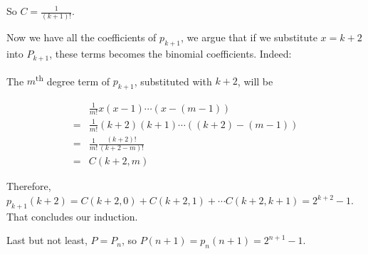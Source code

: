 So $ C = \frac{1}{(k + 1)!} $.

Now we have all the coefficients of $ p_{k+1} $, we argue that if we substitute $ x = k + 2 $ into $ P_{k+1} $, these terms becomes the binomial coefficients. Indeed:

The $ m $\textsuperscript{th} degree term of $ p_{k+1} $, substituted with $ k + 2 $, will be

\begin{align*}
   & \frac{1}{m!}x(x-1)\cdots(x-(m-1))         \\
  =& \frac{1}{m!}(k+2)(k+1)\cdots((k+2)-(m-1)) \\
  =& \frac{1}{m!}\frac{(k+2)!}{(k+2 - m)!}     \\
  =& C(k+2, m)
\end{align*}

Therefore, $ p_{k+1}(k+2) = C(k+2, 0) + C(k+2, 1) + \cdots C(k+2, k+1) = 2^{k+2} - 1 $. That concludes our induction.

Last but not least, $ P = P_n $, so $ P(n + 1) = p_n(n + 1) = 2^{n+1} - 1 $.